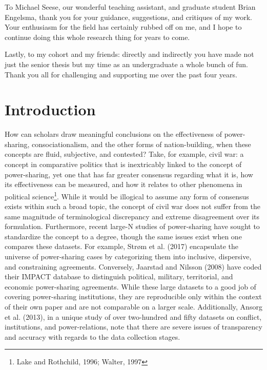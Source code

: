 \documentclass[12pt]{article}
\begin{document}
To Michael Seese, our wonderful teaching assistant, and graduate student Brian Engelsma, thank you for your guidance, suggestions, and critiques of my work. Your enthusiasm for the field has certainly rubbed off on me, and I hope to continue doing this whole research thing for years to come. 

Lastly, to my cohort and my friends: directly and indirectly you have made not just the senior thesis but my time as an undergraduate a whole bunch of fun. Thank you all for challenging and supporting me over the past four years.

\pagebreak


\doublespacing

\section{Introduction}
How can scholars draw meaningful conclusions on the effectiveness of power-sharing, consociationalism, and the other forms of nation-building, when these concepts are fluid, subjective, and contested? Take, for example, civil war: a concept in comparative politics that is inextricably linked to the concept of power-sharing, yet one that has far greater consensus regarding what it is, how its effectiveness can be measured, and how it relates to other phenomena in political science\footnote{Lake and Rothchild, 1996; Walter, 1997}. While it would be illogical to assume any form of consensus exists within such a broad topic, the concept of civil war does not suffer from the same magnitude of terminological discrepancy and extreme disagreement over its formulation. Furthermore, recent large-N studies of power-sharing have sought to standardize the concept to a degree, though the same issues exist when one compares these datasets. For example, Strøm et al. (2017) encapsulate the universe of power-sharing cases by categorizing them into inclusive, dispersive, and constraining agreements. Conversely, Jaarstad and Nilsson (2008) have coded their IMPACT database to distinguish political, military, territorial, and economic power-sharing agreements. While these large datasets to a good job of covering power-sharing institutions, they are reproducible only within the context of their own paper and are not comparable on a larger scale. Additionally, Ansorg et al. (2013), in a unique study of over two-hundred and fifty datasets on conflict, institutions, and power-relations, note that there are severe issues of transparency and accuracy with regards to the data collection stages.
\end{document}
